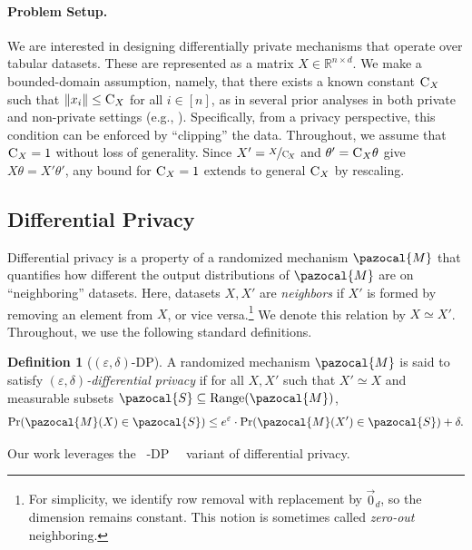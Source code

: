 \documentclass[11pt]{article}
\theoremstyle{definition}
\newtheorem{defn}{Definition}
\theoremstyle{plain}
\newcommand{\reals}{\mathbb{R}}
\newcommand{\eps}{{\varepsilon}}
\newcommand{\Norm}[1]{\left\| #1 \right\|}
\providecommand{\norm}[1]{\Norm{#1}}
\newcommand{\pM}{\pazocal{M}}
\newcommand{\pS}{\pazocal{S}}
\newcommand{\DP}{{\normalfont DP}~}
\newcommand{\Renyi}{{\normalfont R\'enyi}~}
\newcommand{\RenyiDP}{{\normalfont \Renyi\hspace{-.3em}-\DP}~}
\renewcommand{\eps}{\varepsilon}
\begin{document}
\paragraph{Problem Setup.}
We are interested in designing differentially private mechanisms that operate over tabular datasets.
These are represented as a matrix $X \in \reals^{n\times d}$. We make a bounded-domain assumption, namely, that there exists a known constant $\textsc{C}_X$ such that $\norm{x_i} \le \textsc{C}_X$ for all $i \in [n]$, as in several prior analyses in both private and non-private settings (e.g., \citet{shamir2015sample, wang_adassp}).
Specifically, from a privacy perspective, this condition can be enforced by ``clipping'' the data. Throughout, we assume that $\textsc{C}_X = 1$ without loss of generality. Since $X'= \nicefrac{X}{\textsc{C}_{\hspace{-0.1em}X}}$ and $\theta'=\textsc{C}_{X}\theta$ give $X\theta = X'\theta'$, any bound for $\textsc{C}_{X}=1$ extends to general $\textsc{C}_X$ by rescaling.
\subsection{Differential Privacy}
\label{s:bckg_DP}

Differential privacy \citep{dwork2006calibrating} is a property of a randomized mechanism \(\pM\) that quantifies how different the output distributions of \(\pM\) are on ``neighboring'' datasets. Here, datasets $X, X'$ are \emph{neighbors} if \(X'\) is formed by removing an element from \(X\), or vice versa.\footnote{For simplicity, we identify row removal with replacement by \(\vec{0}_{d}\), so the dimension remains constant. This notion is sometimes called \emph{zero-out} neighboring.} We denote this relation by \(X \simeq X'\). Throughout, we use the following standard definitions.

\begin{defn}[$(\eps,\delta)$-DP]
\label{defn:eps_delta_DP}
A randomized mechanism $\pM$ is said to satisfy \emph{$(\eps, \delta)$-differential privacy} if for all \(X, X'\) such that $X' \simeq X$ and measurable subsets $\pS \subseteq \mathrm{Range}(\pM)$,
\begin{equation}
    \label{eq:eps_delta_DP}
    \Pr(\pM(X) \in \pS) \leq e^{\eps} \cdot \Pr(\pM(X') \in \pS) + \delta.
\end{equation}
\end{defn}

Our work leverages the \RenyiDP \citep{mironov2017renyi} variant of differential privacy.
\end{document}
